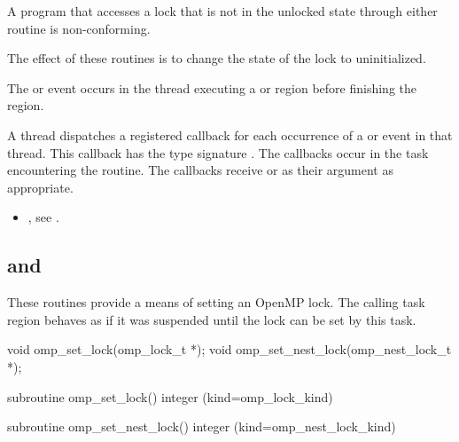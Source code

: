\constraints
A program that accesses a lock that is not in the unlocked state through either routine is
non-conforming.

\effect
The effect of these routines is to change the state of the lock to uninitialized.

\events

The  or  event occurs in the thread
executing a  or  region
before finishing the region.

\tools

A thread dispatches a registered 
callback for each occurrence of a  or  event
in that thread.  This callback has the type signature .
The callbacks occur in the task encountering the routine.
The callbacks receive  or
  as their  argument as appropriate.


\crossreferences
\begin{itemize}
\item {}, see
.
\end{itemize}









\subsection{ and }
\label{subsec:omp_set_lock and omp_set_nest_lock}
\summary
These routines provide a means of setting an OpenMP lock. The calling
task region behaves as if it was suspended until the lock can be set
by this task.

\format
\begin{ccppspecific}
\begin{ompcFunction}
void omp_set_lock(omp_lock_t *);
void omp_set_nest_lock(omp_nest_lock_t *);
\end{ompcFunction}
\end{ccppspecific}

\begin{fortranspecific}
\begin{ompfSubroutine}
subroutine omp_set_lock()
integer (kind=omp_lock_kind) 

subroutine omp_set_nest_lock()
integer (kind=omp_nest_lock_kind) 
\end{ompfSubroutine}
\end{fortranspecific}

